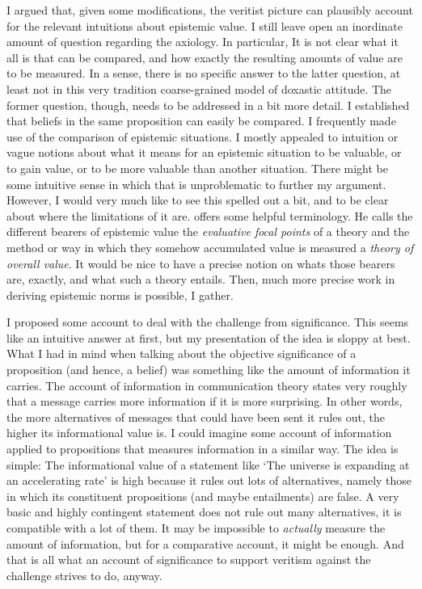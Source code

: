 \documentclass[12pt,numbers=noenddot]{scrartcl}
\begin{document}
I argued that, given some modifications, the veritist picture can plausibly account for the relevant intuitions about epistemic value. I still leave open an inordinate amount of question regarding the axiology. In particular, It is not clear what it all is that can be compared, and how exactly the resulting amounts of value are to be measured. In a sense, there is no specific answer to the latter question, at least not in this very tradition coarse-grained model of doxastic attitude. The former question, though, needs to be addressed in a bit more detail. I established that beliefs in the same proposition can easily be compared. I frequently made use of the comparison of epistemic situations. I mostly appealed to intuition or vague notions about what it means for an epistemic situation to be valuable, or to gain value, or to be more valuable than another situation. There might be some intuitive sense in which that is unproblematic to further my argument. However, I would very much like to see this spelled out a bit, and to be clear about where the limitations of it are. \textcite{Berker2013-BERETA-2} offers some helpful terminology. He calls the different bearers of epistemic value the \emph{evaluative focal points} of a theory and the method or way in which they somehow accumulated value is measured a \emph{theory of overall value}. It would be nice to have a precise notion on whats those bearers are, exactly, and what such a theory entails. Then, much more precise work in deriving epistemic norms is possible, I gather.

I proposed some account to deal with the challenge from significance. This seems like an intuitive answer at first, but my presentation of the idea is sloppy at best. What I had in mind when talking about the objective significance of a proposition (and hence, a belief) was something like the amount of information it carries. The account of information in communication theory states very roughly that a message carries more information if it is more surprising. In other words, the more alternatives of messages that could have been sent it rules out, the higher its informational value is. I could imagine some account of information applied to propositions that measures information in a similar way. The idea is simple: The informational value of a statement like ‘The universe is expanding at an accelerating rate’ is high because it rules out lots of alternatives, namely those in which its constituent propositions (and maybe entailments) are false. A very basic and highly contingent statement does not rule out many alternatives, it is compatible with a lot of them. It may be impossible to \emph{actually} measure the amount of information, but for a comparative account, it might be enough. And that is all what an account of significance to support veritism against the challenge strives to do, anyway.
\end{document}

